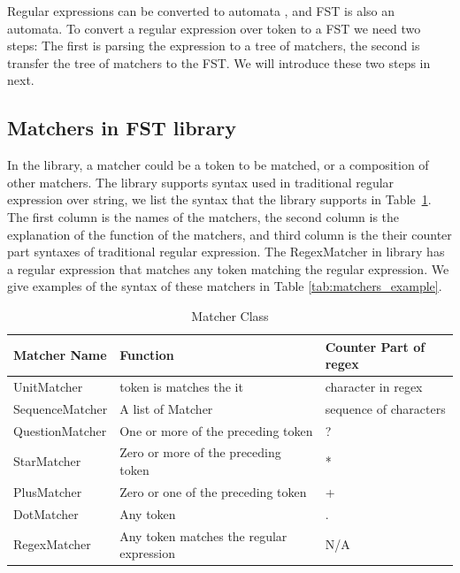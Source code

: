 Regular expressions can be converted to automata \cite{aho1992foundations}, and FST is also an automata. To convert a regular expression over token to a FST we need two steps: The first is parsing the expression to a tree of matchers, the second is transfer the tree of matchers to the FST. We will introduce these two steps in next.  

\subsection{Matchers in FST library}

In the library, a matcher could be a token to be matched, or a composition of other matchers. The library supports syntax used in traditional regular expression over string, we list the syntax that the library supports in Table~\ref{tab:matchers}. The first column is the names of the matchers, the second column is the explanation of the function of the matchers, and third column is the their counter part syntaxes of traditional regular expression. The RegexMatcher in library has a regular expression that matches any token matching the regular expression. We give examples of the syntax of these matchers in Table \ref{tab:matchers_example}.

\begin{table}[ht]
\caption{Matcher Class } %
\centering %
\begin{tabular}{  | l | l | l |  }
 \hline
 Matcher Name        &  Function                                 & Counter Part of regex    \\
 \hline
 UnitMatcher       &  token is matches the it                  & character  in regex       \\
 \hline
 SequenceMatcher   &  A list of Matcher                        & sequence of characters       \\
  \hline
 QuestionMatcher   &  One or more of the preceding token       & ?       \\
  \hline
 StarMatcher       &  Zero or more of the preceding token      & *       \\
  \hline
 PlusMatcher       &  Zero or one of the preceding token       & +       \\
  \hline
 DotMatcher        &  Any token                                & .      \\
  \hline
 RegexMatcher      &  Any token matches the regular expression               &  N/A      \\
  \hline
\end{tabular}
\label{tab:matchers} %
\end{table}



